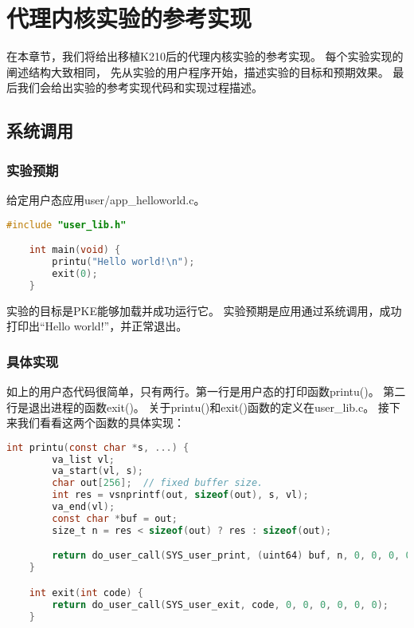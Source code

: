 \chapter{代理内核实验的参考实现}

在本章节，我们将给出移植K210后的代理内核实验的参考实现。
每个实验实现的阐述结构大致相同，
先从实验的用户程序开始，描述实验的目标和预期效果。
最后我们会给出实验的参考实现代码和实现过程描述。

\section{系统调用}

\subsection{实验预期}

给定用户态应用user/app\_helloworld.c。

\begin{lstlisting}[caption={用户态应用app\_helloworld.c}, label={lst:app_helloworld}, language=C]
    #include "user_lib.h"

    int main(void) {
        printu("Hello world!\n");
        exit(0);
    }   
\end{lstlisting}

实验的目标是PKE能够加载并成功运行它。
实验预期是应用通过系统调用，成功打印出“Hello world!”，并正常退出。

\subsection{具体实现}

如上的用户态代码很简单，只有两行。第一行是用户态的打印函数printu()。
第二行是退出进程的函数exit()。
关于printu()和exit()函数的定义在user\_lib.c。
接下来我们看看这两个函数的具体实现：

\begin{lstlisting}[caption={printu与exit的实现}, label={lst:printu_exit}, language=C]
    int printu(const char *s, ...) {
        va_list vl;
        va_start(vl, s);
        char out[256];  // fixed buffer size.
        int res = vsnprintf(out, sizeof(out), s, vl);
        va_end(vl);
        const char *buf = out;
        size_t n = res < sizeof(out) ? res : sizeof(out);

        return do_user_call(SYS_user_print, (uint64) buf, n, 0, 0, 0, 0, 0);
    }

    int exit(int code) {
        return do_user_call(SYS_user_exit, code, 0, 0, 0, 0, 0, 0);
    }   
\end{lstlisting}

